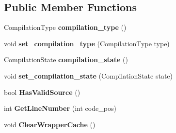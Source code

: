 \subsection*{Public Member Functions}
\begin{DoxyCompactItemize}
\item 
\hypertarget{classv8_1_1internal_1_1_script_ae3652d31a2782b16aab75be392caec97}{}Compilation\+Type {\bfseries compilation\+\_\+type} ()\label{classv8_1_1internal_1_1_script_ae3652d31a2782b16aab75be392caec97}

\item 
\hypertarget{classv8_1_1internal_1_1_script_ac5c747e61ee61b21cb9b3b41fb8f7e37}{}void {\bfseries set\+\_\+compilation\+\_\+type} (Compilation\+Type type)\label{classv8_1_1internal_1_1_script_ac5c747e61ee61b21cb9b3b41fb8f7e37}

\item 
\hypertarget{classv8_1_1internal_1_1_script_a36c45ec6978ec29f14a5f4d5107040a4}{}Compilation\+State {\bfseries compilation\+\_\+state} ()\label{classv8_1_1internal_1_1_script_a36c45ec6978ec29f14a5f4d5107040a4}

\item 
\hypertarget{classv8_1_1internal_1_1_script_ad6da453b2b624bb195815bd5463d8d05}{}void {\bfseries set\+\_\+compilation\+\_\+state} (Compilation\+State state)\label{classv8_1_1internal_1_1_script_ad6da453b2b624bb195815bd5463d8d05}

\item 
\hypertarget{classv8_1_1internal_1_1_script_a1e8a6bb49156831a6a52ff05c4635208}{}bool {\bfseries Has\+Valid\+Source} ()\label{classv8_1_1internal_1_1_script_a1e8a6bb49156831a6a52ff05c4635208}

\item 
\hypertarget{classv8_1_1internal_1_1_script_a112cba4bc4be05febf66068ac7aae26c}{}int {\bfseries Get\+Line\+Number} (int code\+\_\+pos)\label{classv8_1_1internal_1_1_script_a112cba4bc4be05febf66068ac7aae26c}

\item 
\hypertarget{classv8_1_1internal_1_1_script_a79960904f58df0bf0c238d093f4fae55}{}void {\bfseries Clear\+Wrapper\+Cache} ()\label{classv8_1_1internal_1_1_script_a79960904f58df0bf0c238d093f4fae55}

\end{DoxyCompactItemize}
